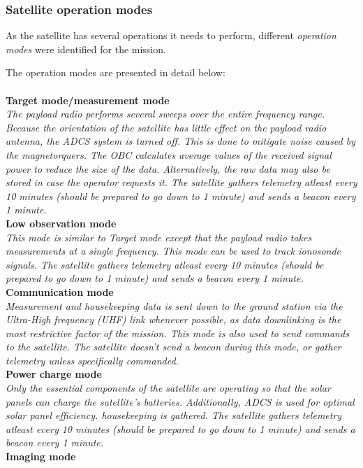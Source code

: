 \documentclass[english,12pt,a4paper,pdftex,elec,utf8]{aaltothesis}
\begin{document}
\subsubsection{Satellite operation modes}
As the satellite has several operations it needs to perform, different \textit{operation modes} were identified for the mission. \par
The operation modes are presented in detail below:\\
\\
\textbf{Target mode/measurement mode}\\
\textit{The payload radio performs several sweeps over the entire frequency range. Because the orientation of the satellite has little effect on the payload radio antenna, the ADCS system is turned off. This is done to mitigate noise caused by the magnetorquers. The OBC calculates average values of the received signal power to reduce the size of the data. Alternatively, the raw data may also be stored in case the operator requests it. The satellite gathers telemetry atleast every 10 minutes (should be prepared to go down to 1 minute) and sends a beacon every 1 minute.}\\
\textbf{Low observation mode}\\
\textit{This mode is similar to Target mode except that the payload radio takes measurements at a single frequency. This mode can be used to track ionosonde signals. The satellite gathers telemetry atleast every 10 minutes (should be prepared to go down to 1 minute) and sends a beacon every 1 minute.}\\
\textbf{Communication mode}\\
\textit{Measurement and housekeeping data is sent down to the ground station via the Ultra-High frequency (UHF) link whenever possible, as data downlinking is the most restrictive factor of the mission. This mode is also used to send commands to the satellite. The satellite doesn't send a beacon during this mode, or gather telemetry unless specifically commanded.}\\
\textbf{Power charge mode}\\
\textit{Only the essential components of the satellite are operating so that the solar panels can charge the satellite's batteries. Additionally, ADCS is used for optimal solar panel efficiency. housekeeping is gathered. The satellite gathers telemetry atleast every 10 minutes (should be prepared to go down to 1 minute) and sends a beacon every 1 minute.}\\
\textbf{Imaging mode}\\
\end{document}
